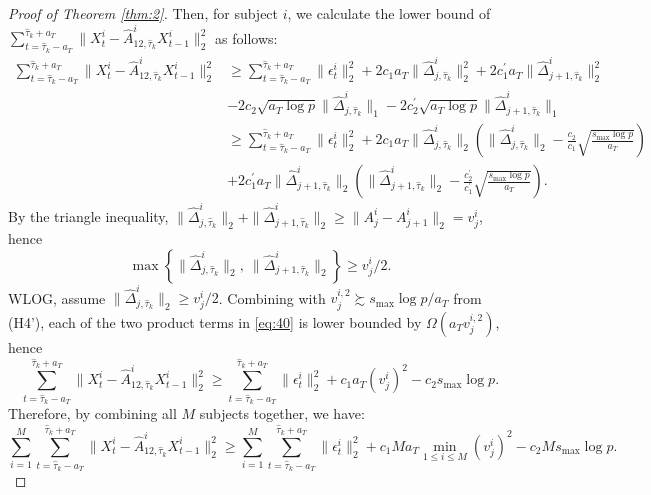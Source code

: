 \documentclass[11pt]{article}
\begin{document}
\begin{proof}[Proof of Theorem \ref{thm:2}]
Then, for subject $i$, we calculate the lower bound of $\sum_{t=\widehat{\tau}_k-a_T}^{\widehat{\tau}_k+a_T}\|X_t^i - \widehat{A}^i_{12,\widehat{\tau}_k}X_{t-1}^i\|_2^2$ as follows:
\begin{align}
    \label{eq:40}
    \sum_{t=\widehat{\tau}_k-a_T}^{\widehat{\tau}_k+a_T}\|X_t^i - \widehat{A}^i_{12,\widehat{\tau}_k}X_{t-1}^i\|_2^2
    &\geq \sum_{t=\widehat{\tau}_k-a_T}^{\widehat{\tau}_k+a_T}\|\epsilon_t^i\|_2^2 + 2c_1a_T\|\widehat{\Delta}_{j,\widehat{\tau}_k}^i\|_2^2 + 2c_1^\prime a_T\|\widehat{\Delta}_{j+1,\widehat{\tau}_k}^i\|_2^2 \nonumber \\
    &- 2c_2\sqrt{a_T\log p}\|\widehat{\Delta}_{j,\widehat{\tau}_k}^i\|_1 - 2c_2^\prime\sqrt{a_T\log p}\|\widehat{\Delta}_{j+1,\widehat{\tau}_k}^i\|_1 \nonumber \\
    &\geq \sum_{t=\widehat{\tau}_k-a_T}^{\widehat{\tau}_k+a_T}\|\epsilon_t^i\|_2^2 + 2c_1a_T\|\widehat{\Delta}^i_{j,\widehat{\tau}_k}\|_2\left(\|\widehat{\Delta}^i_{j,\widehat{\tau}_k}\|_2 - \frac{c_2}{c_1}\sqrt{\frac{s_{\max}\log p}{a_T}}\right) \nonumber \\
    &+ 2c_1^\prime a_T\|\widehat{\Delta}^i_{j+1,\widehat{\tau}_k}\|_2\left(\|\widehat{\Delta}^i_{j+1,\widehat{\tau}_k}\|_2 - \frac{c_2^\prime}{c_1^\prime}\sqrt{\frac{s_{\max}\log p}{a_T}}\right).
\end{align}
By the triangle inequality, $\|\widehat{\Delta}_{j,\widehat{\tau}_k}^i\|_2 + \|\widehat{\Delta}_{j+1,\widehat{\tau}_k}^i\|_2 \geq \|A_j^i - A_{j+1}^i\|_2 = v_j^i$, hence
\begin{equation*}
    \max\left\{\|\widehat{\Delta}_{j,\widehat{\tau}_k}^i\|_2,\ \|\widehat{\Delta}_{j+1,\widehat{\tau}_k}^i\|_2\right\} \geq v_j^i/2.
\end{equation*}
WLOG, assume $\|\widehat{\Delta}_{j,\widehat{\tau}_k}^i\|_2 \geq v_j^i/2$. Combining with $v_j^{i,2} \succsim s_{\max}\log p/a_T$ from (H4'), each of the two product terms in \eqref{eq:40} is lower bounded by $\Omega(a_T v_j^{i,2})$, hence
\begin{equation}
    \label{eq:40b}
    \sum_{t=\widehat{\tau}_k-a_T}^{\widehat{\tau}_k+a_T}\|X_t^i - \widehat{A}^i_{12,\widehat{\tau}_k}X_{t-1}^i\|_2^2 \geq \sum_{t=\widehat{\tau}_k-a_T}^{\widehat{\tau}_k+a_T}\|\epsilon_t^i\|_2^2 + c_1 a_T (v_j^i)^2 - c_2 s_{\max}\log p.
\end{equation}
Therefore, by combining all $M$ subjects together, we have:
\begin{equation}
    \label{eq:41}
    \sum_{i=1}^M\sum_{t=\widehat{\tau}_k-a_T}^{\widehat{\tau}_k+a_T}\|X_t^i - \widehat{A}^i_{12,\widehat{\tau}_k}X_{t-1}^i\|_2^2 \geq \sum_{i=1}^M\sum_{t=\widehat{\tau}_k-a_T}^{\widehat{\tau}_k+a_T}\|\epsilon_t^i\|_2^2 + c_1 M a_T \min_{1\leq i \leq M}(v_j^i)^2 - c_2 M s_{\max}\log p.
\end{equation}


\end{proof}
\end{document}
